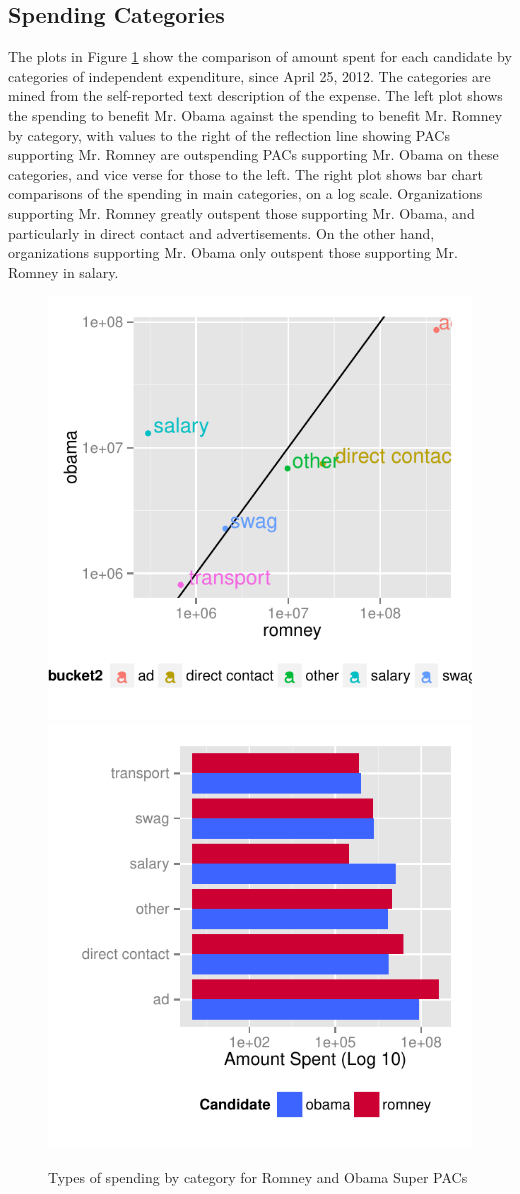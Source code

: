 \documentclass[11pt]{article}\usepackage{graphicx, color}
\newenvironment{knitrout}{}{} %
\begin{document}
\subsection{Spending Categories}
The plots in Figure \ref{fig:type_plot} show the comparison of amount spent for each candidate by categories of independent expenditure, since April 25, 2012. The categories are mined from the self-reported text description of the expense. The left plot shows the spending to benefit Mr. Obama against the spending to benefit Mr. Romney by category, with values to the right of the reflection line showing PACs supporting Mr. Romney are outspending PACs supporting Mr. Obama on these categories, and vice verse for those to the left. The right plot shows bar chart comparisons of the spending in main categories, on a log scale.
Organizations supporting Mr. Romney greatly outspent those supporting Mr. Obama, and particularly in direct contact and advertisements. On the other hand, organizations supporting Mr. Obama only outspent those supporting Mr. Romney in salary. 

\begin{knitrout}
\color{fgcolor}\begin{figure}[H]


{\centering \includegraphics[width=.4\textwidth]{figure/type_plot1} \includegraphics[width=.4\textwidth]{figure/type_plot2} 

}

\caption[Types of spending by category for Romney and Obama Super PACs]{Types of spending by category for Romney and Obama Super PACs\label{fig:type_plot}}
\end{figure}

\end{knitrout}
\end{document}

